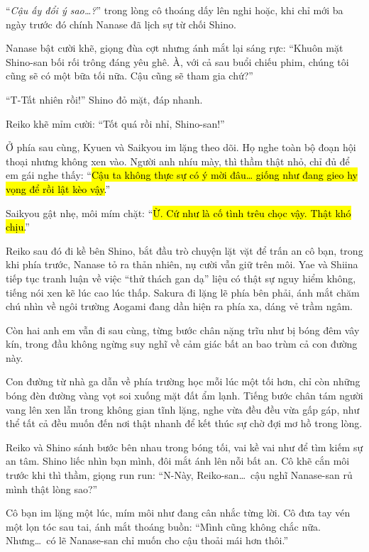 \documentclass[../main.tex]{subfiles}
\begin{document}
``\textit{Cậu ấy đổi ý sao\dots?}'' trong lòng cô thoáng dấy lên nghi hoặc, khi chỉ mới ba ngày trước đó chính Nanase đã lịch sự từ chối Shino.

Nanase bật cười khẽ, giọng đùa cợt nhưng ánh mắt lại sáng rực: ``Khuôn mặt Shino-san bối rối trông đáng yêu ghê. À, với cả sau buổi chiếu phim, chúng tôi cũng sẽ có một bữa tối nữa. Cậu cũng sẽ tham gia chứ?''

``T-Tất nhiên rồi!'' Shino đỏ mặt, đáp nhanh.

Reiko khẽ mỉm cười: ``Tốt quá rồi nhỉ, Shino-san!''


Ở phía sau cùng, Kyuen và Saikyou im lặng theo dõi. Họ nghe toàn bộ đoạn hội thoại nhưng không xen vào. Người anh nhíu mày, thì thầm thật nhỏ, chỉ đủ để em gái nghe thấy: ``\hl{Cậu ta không thực sự có ý mời đâu\dots{} giống như đang gieo hy vọng để rồi lật kèo vậy.}''

Saikyou gật nhẹ, môi mím chặt: ``\hl{Ừ. Cứ như là cố tình trêu chọc vậy. Thật khó chịu.}''

Reiko sau đó đi kề bên Shino, bắt đầu trò chuyện lặt vặt để trấn an cô bạn, trong khi phía trước, Nanase tỏ ra thản nhiên, nụ cười vẫn giữ trên môi. Yae và Shiina tiếp tục tranh luận về việc ``thử thách gan dạ'' liệu có thật sự nguy hiểm không, tiếng nói xen kẽ lúc cao lúc thấp. Sakura đi lặng lẽ phía bên phải, ánh mắt chăm chú nhìn về ngôi trường Aogami đang dần hiện ra phía xa, dáng vẻ trầm ngâm.

Còn hai anh em vẫn đi sau cùng, từng bước chân nặng trĩu như bị bóng đêm vây kín, trong đầu không ngừng suy nghĩ về cảm giác bất an bao trùm cả con đường này.

Con đường từ nhà ga dẫn về phía trường học mỗi lúc một tối hơn, chỉ còn những bóng đèn đường vàng vọt soi xuống mặt đất ẩm lạnh. Tiếng bước chân tám người vang lên xen lẫn trong không gian tĩnh lặng, nghe vừa đều đều vừa gấp gáp, như thể tất cả đều muốn đến nơi thật nhanh để kết thúc sự chờ đợi mơ hồ trong lòng.

Reiko và Shino sánh bước bên nhau trong bóng tối, vai kề vai như để tìm kiếm sự an tâm. Shino liếc nhìn bạn mình, đôi mắt ánh lên nỗi bất an. Cô khẽ cắn môi trước khi thì thầm, giọng run run: ``N-Này, Reiko-san\dots\ cậu nghĩ Nanase-san rủ mình thật lòng sao?''

Cô bạn im lặng một lúc, mím môi như đang cân nhắc từng lời. Cô đưa tay vén một lọn tóc sau tai, ánh mắt thoáng buồn: ``Mình cũng không chắc nữa. Nhưng\dots\ có lẽ Nanase-san chỉ muốn cho cậu thoải mái hơn thôi.''
\end{document}

